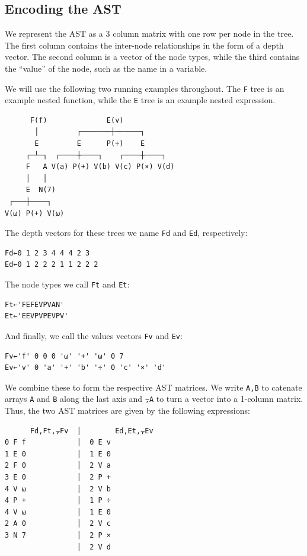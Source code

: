 ﻿\documentclass[numbers,10pt,preprint]{sigplanconf}
\begin{document}
\subsection{Encoding the AST}

We represent the AST as a 3 column matrix with one row per node in the tree. The first column contains the inter-node relationships in the form of a depth vector. The second column is a vector of the node types, while the third contains the ``value'' of the node, such as the name in a variable.

We will use the following two running examples throughout. The \verb;F; tree is an example nested function, while the \verb;E; tree is an example nested expression.

\begin{verbatim}
      F(f)              E(v)
       │         ┌───────┼──────┐
       E         E      P(÷)    E
     ┌─┴─┐  ┌────┼────┐    ┌────┼────┐
     F   A V(a) P(+) V(b) V(c) P(×) V(d)
     │   │
     E  N(7) 
 ┌───┼────┐
V(⍵) P(+) V(⍵)
\end{verbatim}

\noindent
The depth vectors for these trees we name \verb;Fd; and \verb;Ed;, respectively:

\begin{verbatim}
Fd←0 1 2 3 4 4 4 2 3
Ed←0 1 2 2 2 1 1 2 2 2
\end{verbatim}

\noindent
The node types we call \verb;Ft; and \verb;Et;:

\begin{verbatim}
Ft←'FEFEVPVAN'
Et←'EEVPVPEVPV'
\end{verbatim}

\noindent
And finally, we call the values vectors \verb;Fv; and \verb;Ev;:

\begin{verbatim}
Fv←'f' 0 0 0 '⍵' '+' '⍵' 0 7
Ev←'v' 0 'a' '+' 'b' '÷' 0 'c' '×' 'd'
\end{verbatim}

\noindent We combine these to form the respective AST matrices. We write \verb;A,B; to catenate arrays \verb;A; and \verb;B; along the last axis and \verb;⍪A; to turn a vector into a 1-column matrix. Thus, the two AST matrices are given by the following expressions:

\begin{verbatim}
      Fd,Ft,⍪Fv  │        Ed,Et,⍪Ev
0 F f            │  0 E v
1 E 0            │  1 E 0
2 F 0            │  2 V a
3 E 0            │  2 P +
4 V ⍵            │  2 V b
4 P +            │  1 P ÷
4 V ⍵            │  1 E 0
2 A 0            │  2 V c
3 N 7            │  2 P ×
                 │  2 V d
\end{verbatim}
\end{document}
